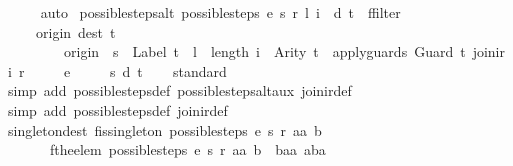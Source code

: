 \begin{isabellebody}
\ \ \ \ \isamarkupfalse%
\ auto\isanewline
{}\isamarkupfalse%
%
\endisatagproof
{\isafoldproof}%
%
\isadelimproof
\isanewline
%
\endisadelimproof
\isanewline
{}\isamarkupfalse%
\ possible{\isacharunderscore}steps{\isacharunderscore}alt{\isacharcolon}\ {\isachardoublequoteopen}{\isacharparenleft}possible{\isacharunderscore}steps\ e\ s\ r\ l\ i\ {\isacharequal}\ {\isacharbraceleft}{\isacharbar}{\isacharparenleft}d{\isacharcomma}\ t{\isacharparenright}{\isacharbar}{\isacharbraceright}{\isacharparenright}\ {\isacharequal}\ {\isacharparenleft}ffilter\isanewline
\ \ \ \ \ {\isacharparenleft}{\isasymlambda}{\isacharparenleft}{\isacharparenleft}origin{\isacharcomma}\ dest{\isacharparenright}{\isacharcomma}\ t{\isacharparenright}{\isachardot}\isanewline
\ \ \ \ \ \ \ \ \ origin\ {\isacharequal}\ s\ {\isasymand}\ Label\ t\ {\isacharequal}\ l\ {\isasymand}\ length\ i\ {\isacharequal}\ Arity\ t\ {\isasymand}\ apply{\isacharunderscore}guards\ {\isacharparenleft}Guard\ t{\isacharparenright}\ {\isacharparenleft}join{\isacharunderscore}ir\ i\ r{\isacharparenright}{\isacharparenright}\isanewline
\ \ \ \ \ e\ {\isacharequal}\isanewline
\ \ \ \ {\isacharbraceleft}{\isacharbar}{\isacharparenleft}{\isacharparenleft}s{\isacharcomma}\ d{\isacharparenright}{\isacharcomma}\ t{\isacharparenright}{\isacharbar}{\isacharbraceright}{\isacharparenright}{\isachardoublequoteclose}\isanewline
%
\isadelimproof
\ \ %
\endisadelimproof
%
\isatagproof
{}\isamarkupfalse%
\ standard\isanewline
\ \ \ \isamarkupfalse%
\ {\isacharparenleft}simp\ add{\isacharcolon}\ possible{\isacharunderscore}steps{\isacharunderscore}def\ possible{\isacharunderscore}steps{\isacharunderscore}alt{\isacharunderscore}aux\ join{\isacharunderscore}ir{\isacharunderscore}def{\isacharparenright}\isanewline
\ \ \isamarkupfalse%
\ {\isacharparenleft}simp\ add{\isacharcolon}\ possible{\isacharunderscore}steps{\isacharunderscore}def\ join{\isacharunderscore}ir{\isacharunderscore}def{\isacharparenright}%
\endisatagproof
{\isafoldproof}%
%
\isadelimproof
\isanewline
%
\endisadelimproof
\isanewline
{}\isamarkupfalse%
\ singleton{\isacharunderscore}dest{\isacharcolon}\ {\isachardoublequoteopen}fis{\isacharunderscore}singleton\ {\isacharparenleft}possible{\isacharunderscore}steps\ e\ s\ r\ aa\ b{\isacharparenright}\ {\isasymLongrightarrow}\isanewline
\ \ \ \ \ \ \ fthe{\isacharunderscore}elem\ {\isacharparenleft}possible{\isacharunderscore}steps\ e\ s\ r\ aa\ b{\isacharparenright}\ {\isacharequal}\ {\isacharparenleft}baa{\isacharcomma}\ aba{\isacharparenright}\ {\isasymLongrightarrow}\isanewline

\end{isabellebody}

